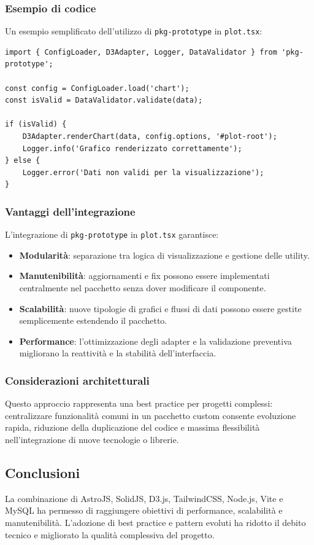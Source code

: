 \subsubsection{Esempio di codice}
Un esempio semplificato dell’utilizzo di \texttt{pkg-prototype} in \texttt{plot.tsx}:
\begin{verbatim}
import { ConfigLoader, D3Adapter, Logger, DataValidator } from 'pkg-prototype';

const config = ConfigLoader.load('chart');
const isValid = DataValidator.validate(data);

if (isValid) {
    D3Adapter.renderChart(data, config.options, '#plot-root');
    Logger.info('Grafico renderizzato correttamente');
} else {
    Logger.error('Dati non validi per la visualizzazione');
}
\end{verbatim}

\subsubsection{Vantaggi dell’integrazione}
L’integrazione di \texttt{pkg-prototype} in \texttt{plot.tsx} garantisce:
\begin{itemize}
    \item \textbf{Modularità}: separazione tra logica di visualizzazione e gestione delle utility.
    \item \textbf{Manutenibilità}: aggiornamenti e fix possono essere implementati centralmente nel pacchetto senza dover modificare il componente.
    \item \textbf{Scalabilità}: nuove tipologie di grafici e flussi di dati possono essere gestite semplicemente estendendo il pacchetto.
    \item \textbf{Performance}: l’ottimizzazione degli adapter e la validazione preventiva migliorano la reattività e la stabilità dell’interfaccia.
\end{itemize}

\subsubsection{Considerazioni architetturali}
Questo approccio rappresenta una best practice per progetti complessi: centralizzare funzionalità comuni in un pacchetto custom consente evoluzione rapida, riduzione della duplicazione del codice e massima flessibilità nell’integrazione di nuove tecnologie o librerie.


\subsection{Conclusioni}
La combinazione di AstroJS, SolidJS, D3.js, TailwindCSS, Node.js, Vite e MySQL ha permesso di raggiungere obiettivi di performance, scalabilità e manutenibilità. L’adozione di best practice e pattern evoluti ha ridotto il debito tecnico e migliorato la qualità complessiva del progetto.
